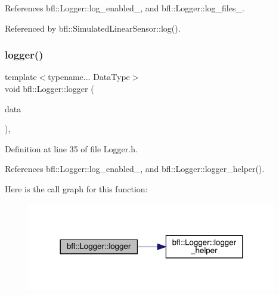 References bfl\+::\+Logger\+::log\+\_\+enabled\+\_\+, and bfl\+::\+Logger\+::log\+\_\+files\+\_\+.



Referenced by bfl\+::\+Simulated\+Linear\+Sensor\+::log().

\mbox{\label{classbfl_1_1Logger_aca2086c9256e5c404872b91f7f25b97d}} 
\subsubsection{\texorpdfstring{logger()}{logger()}\hspace{0.1cm}{\footnotesize\ttfamily [2/4]}}
{\footnotesize\ttfamily template$<$typename... Data\+Type$>$ \\
void bfl\+::\+Logger\+::logger (\begin{DoxyParamCaption}\item[{Data\+Type...}]{data }\end{DoxyParamCaption})\hspace{0.3cm}{\ttfamily [inline]}, {\ttfamily [inherited]}}



Definition at line 35 of file Logger.\+h.



References bfl\+::\+Logger\+::log\+\_\+enabled\+\_\+, and bfl\+::\+Logger\+::logger\+\_\+helper().

Here is the call graph for this function\+:
\nopagebreak
\begin{figure}[H]
\begin{center}
\leavevmode
\includegraphics[width=309pt]{classbfl_1_1Logger_aca2086c9256e5c404872b91f7f25b97d_cgraph}
\end{center}
\end{figure}
\mbox{\label{classbfl_1_1Logger_a50b1c109730fa98f66e66f420f0158fe}} 
